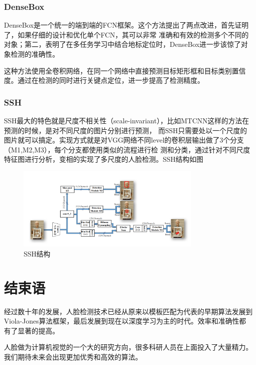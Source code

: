 \documentclass[UTF8]{ctexart}
\begin{document}
\subsubsection{DenseBox}
DenseBox\cite{huang2015densebox}是一个统一的端到端的FCN框架。这个方法提出了两点改进，首先证明了，如果仔细的设计和优化单个FCN，其可以非常
准确和有效的检测多个不同的对象；第二，表明了在多任务学习中结合地标定位时，DenseBox进一步该惊了对象检测的准确性。

这种方法使用全卷积网络，在同一个网络中直接预测目标矩形框和目标类别置信度。通过在检测的同时进行关键点定位，进一步提高了检测精度。
\subsubsection{SSH}
SSH\cite{najibi2017ssh}最大的特色就是尺度不相关性（scale-invariant），比如MTCNN这样的方法在预测的时候，是对不同尺度的图片分别进行预测，
而SSH只需要处以一个尺度的图片就可以搞定。实现方式就是对VGG网络不同level的卷积层输出做了3个分支（M1,M2,M3），每个分支都使用类似的流程进行检
测和分类，通过针对不同尺度特征图进行分析，变相的实现了多尺度的人脸检测。SSH结构如图
\begin{figure}[H]
    \centering
    \includegraphics[width=0.8\textwidth]{img/ssh.png}
    \caption{SSH结构}
\end{figure}
\section{结束语}
经过数十年的发展，人脸检测技术已经从原来以模板匹配为代表的早期算法发展到Viola-Jones算法框架，最后发展到现在以深度学习为主的时代。效率和准确性都
有了显著的提高。

人脸做为计算机视觉的一个大的研究方向，很多科研人员在上面投入了大量精力。我们期待未来会出现更加优秀和高效的算法。
\renewcommand\refname{参考文献}


\end{document}
